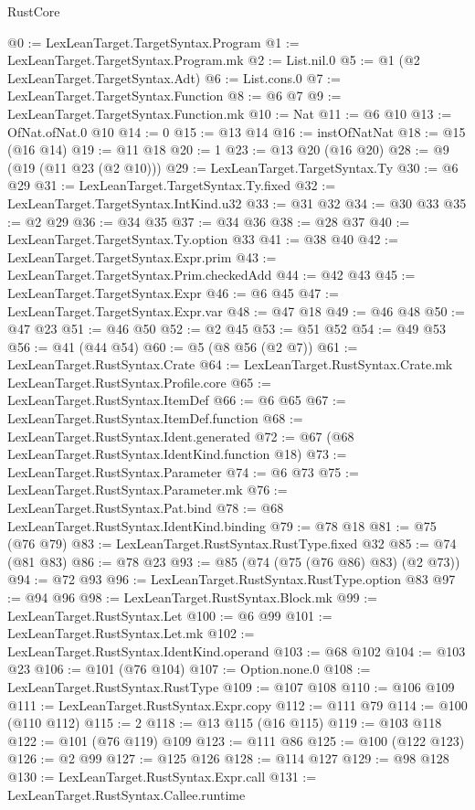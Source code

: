 \begin{lexlean}{RustCore}
\begin{coremodule}
{\begin{coremodule}
{{{{{@0 := LexLeanTarget.TargetSyntax.Program
@1 := LexLeanTarget.TargetSyntax.Program.mk
@2 := List.nil.{0}
@5 := @1 (@2 LexLeanTarget.TargetSyntax.Adt)
@6 := List.cons.{0}
@7 := LexLeanTarget.TargetSyntax.Function
@8 := @6 @7
@9 := LexLeanTarget.TargetSyntax.Function.mk
@10 := Nat
@11 := @6 @10
@13 := OfNat.ofNat.{0} @10
@14 := 0
@15 := @13 @14
@16 := instOfNatNat
@18 := @15 (@16 @14)
@19 := @11 @18
@20 := 1
@23 := @13 @20 (@16 @20)
@28 := @9 (@19 (@11 @23 (@2 @10)))
@29 := LexLeanTarget.TargetSyntax.Ty
@30 := @6 @29
@31 := LexLeanTarget.TargetSyntax.Ty.fixed
@32 := LexLeanTarget.TargetSyntax.IntKind.u32
@33 := @31 @32
@34 := @30 @33
@35 := @2 @29
@36 := @34 @35
@37 := @34 @36
@38 := @28 @37
@40 := LexLeanTarget.TargetSyntax.Ty.option @33
@41 := @38 @40
@42 := LexLeanTarget.TargetSyntax.Expr.prim
@43 := LexLeanTarget.TargetSyntax.Prim.checkedAdd
@44 := @42 @43
@45 := LexLeanTarget.TargetSyntax.Expr
@46 := @6 @45
@47 := LexLeanTarget.TargetSyntax.Expr.var
@48 := @47 @18
@49 := @46 @48
@50 := @47 @23
@51 := @46 @50
@52 := @2 @45
@53 := @51 @52
@54 := @49 @53
@56 := @41 (@44 @54)
@60 := @5 (@8 @56 (@2 @7))
@61 := LexLeanTarget.RustSyntax.Crate
@64 := LexLeanTarget.RustSyntax.Crate.mk LexLeanTarget.RustSyntax.Profile.core
@65 := LexLeanTarget.RustSyntax.ItemDef
@66 := @6 @65
@67 := LexLeanTarget.RustSyntax.ItemDef.function
@68 := LexLeanTarget.RustSyntax.Ident.generated
@72 := @67 (@68 LexLeanTarget.RustSyntax.IdentKind.function @18)
@73 := LexLeanTarget.RustSyntax.Parameter
@74 := @6 @73
@75 := LexLeanTarget.RustSyntax.Parameter.mk
@76 := LexLeanTarget.RustSyntax.Pat.bind
@78 := @68 LexLeanTarget.RustSyntax.IdentKind.binding
@79 := @78 @18
@81 := @75 (@76 @79)
@83 := LexLeanTarget.RustSyntax.RustType.fixed @32
@85 := @74 (@81 @83)
@86 := @78 @23
@93 := @85 (@74 (@75 (@76 @86) @83) (@2 @73))
@94 := @72 @93
@96 := LexLeanTarget.RustSyntax.RustType.option @83
@97 := @94 @96
@98 := LexLeanTarget.RustSyntax.Block.mk
@99 := LexLeanTarget.RustSyntax.Let
@100 := @6 @99
@101 := LexLeanTarget.RustSyntax.Let.mk
@102 := LexLeanTarget.RustSyntax.IdentKind.operand
@103 := @68 @102
@104 := @103 @23
@106 := @101 (@76 @104)
@107 := Option.none.{0}
@108 := LexLeanTarget.RustSyntax.RustType
@109 := @107 @108
@110 := @106 @109
@111 := LexLeanTarget.RustSyntax.Expr.copy
@112 := @111 @79
@114 := @100 (@110 @112)
@115 := 2
@118 := @13 @115 (@16 @115)
@119 := @103 @118
@122 := @101 (@76 @119) @109
@123 := @111 @86
@125 := @100 (@122 @123)
@126 := @2 @99
@127 := @125 @126
@128 := @114 @127
@129 := @98 @128
@130 := LexLeanTarget.RustSyntax.Expr.call
@131 := LexLeanTarget.RustSyntax.Callee.runtime
}}}}}
\end{coremodule}}
\end{coremodule}
\end{lexlean}
